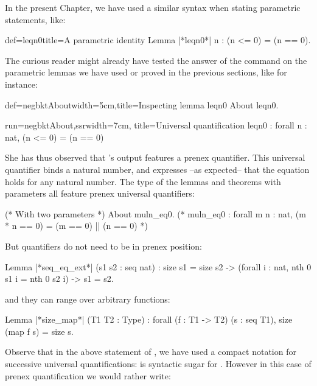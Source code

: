 In the present Chapter, we have used a similar syntax when stating
parametric statements, like:

\begin{coq}{def=leqn0}{title=A parametric identity}
Lemma |*leqn0*| n : (n <= 0) = (n == 0).
\end{coq}

The curious reader might already have tested the answer of the
 command on the parametric lemmas we have used or proved in the
previous sections, like for instance:

\begin{coq}{def=negbktAbout}{width=5cm,title=Inspecting lemma leqn0}
About leqn0.
\end{coq}
\begin{coqout}{run=negbktAbout,ssr}{width=7cm, title=Universal quantification}
leqn0 : forall n : nat, (n <= 0) = (n == 0)
\end{coqout}

She has thus observed that \Coq{}'s output features a prenex
 quantifier. This universal quantifier binds a natural number, and
expresses --as expected-- that the equation holds for any
natural number. The type of the lemmas and theorems with parameters all feature
prenex universal quantifiers:


\begin{coq}{}{}
(* With two parameters *)
About muln_eq0.
  (* muln_eq0 : forall m n : nat, (m * n == 0) = (m == 0) || (n == 0) *)

\end{coq}
But quantifiers do not need to be in prenex position:

\begin{coq}{}{}
Lemma |*seq_eq_ext*| (s1 s2 : seq nat) :
  size s1 = size s2 ->
  (forall i : nat, nth 0 s1 i = nth 0 s2 i) ->
  s1 = s2.
\end{coq}

and they can range over arbitrary functions:
\begin{coq}{}{}
Lemma |*size_map*| (T1 T2 : Type) :
forall (f : T1 -> T2) (s : seq T1), size (map f s) = size s.
\end{coq}

Observe that in the above statement of , we have used a
compact notation for successive universal quantifications:
 is syntactic sugar for
. However in this case
of prenex quantification we would rather write:

